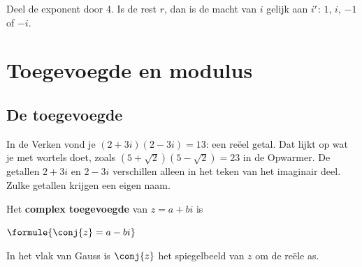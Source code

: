 \begin{werkwijze}
Deel de exponent door 4. Is de rest $r$, dan is de macht van $i$ gelijk aan $i^r$: $1$, $i$, $-1$ of $-i$.
\end{werkwijze}


\begin{oefeningen}
\end{oefeningen}

\section{Toegevoegde en modulus}

\subsection{De toegevoegde}

In de Verken vond je $(2 + 3i)(2 - 3i) = 13$: een reëel getal. Dat lijkt op wat je met wortels doet, zoals $(5 + \sqrt2)(5 - \sqrt2) = 23$ in de Opwarmer. De getallen $2 + 3i$ en $2 - 3i$ verschillen alleen in het teken van het imaginair deel. Zulke getallen krijgen een eigen naam.

\begin{theorie}
\begin{minipage}[t]{.6\linewidth}
\vspace{0pt}
Het \textbf{\textcolor{accent}{complex toegevoegde}} van $z = a + bi$ is

\vspace{1mm}
\qquad $\formule{\conj{z} = a - bi}$

\vspace{1mm}

\vspace{1mm}
In het vlak van Gauss is $\conj{z}$ het spiegelbeeld van $z$ om de reële as.
\end{minipage}\hfill
\begin{minipage}[t]{.36\linewidth}
\vspace{0pt}
\end{minipage}
\end{theorie}

